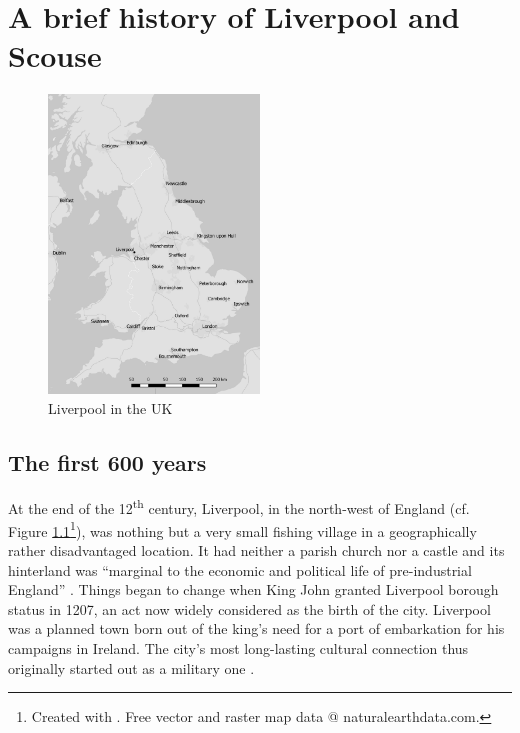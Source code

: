 \chapter{A brief history of Liverpool and Scouse}\label{ch.hist}

	\begin{figure}[h]
		\centering
		\includegraphics[width=0.5\textwidth]{figures/Map-England.png}
		\caption{Liverpool in the UK}
		\label{fig.ex}
	\end{figure}

	\section{The first 600 years}\label{sec.hist.early}

At the end of the 12\textsuperscript{th} century, Liverpool, in the north-west of England (cf. Figure \ref{fig.ex}\footnote{Created with \cite{QGIS2016}. Free vector and raster map data @ naturalearthdata.com.}), was nothing but a very small fishing village in a geographically rather disadvantaged location.
It had neither a parish church nor a castle and its hinterland was ``marginal to the economic and political life of pre-industrial England'' \citep[59]{kermodeetal2006}.
Things began to change when King John granted Liverpool borough status in 1207, an act now widely considered as the birth of the city. 
Liverpool was a planned town born out of the king's need for a port of embarkation for his campaigns in Ireland.
The city's most long-lasting cultural connection thus originally started out as a military one \citeyearpar[cf.][59--63]{kermodeetal2006}.


